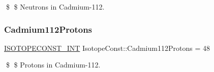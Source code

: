 \$ \$ Neutrons in Cadmium-\/112. \mbox{\label{group___isotope_const-_cadmium-_cd112_gaad20f4927629ce939cc49409efa9d414}} 
\subsubsection{\texorpdfstring{Cadmium112\+Protons}{Cadmium112Protons}}
{\footnotesize\ttfamily \mbox{\hyperlink{group___isotope_const-_macros_ga5f18360b3e99483a35c32d789e62621c}{I\+S\+O\+T\+O\+P\+E\+C\+O\+N\+S\+T\+\_\+\+I\+NT}} Isotope\+Const\+::\+Cadmium112\+Protons = 48}

\$ \$ Protons in Cadmium-\/112. 